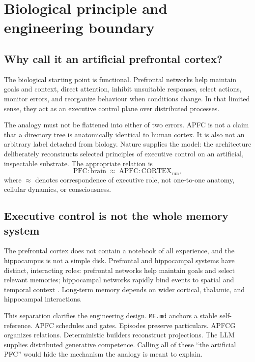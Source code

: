 \documentclass[10pt,twocolumn]{article}
\theoremstyle{definition}
\theoremstyle{plain}
\theoremstyle{remark}
\newcommand{\file}[1]{\nolinkurl{#1}}
\begin{document}
\section{Biological principle and engineering boundary}

\subsection{Why call it an artificial prefrontal cortex?}

The biological starting point is functional.  Prefrontal networks help maintain goals and context, direct attention, inhibit unsuitable responses, select actions, monitor errors, and reorganize behaviour when conditions change.  In that limited sense, they act as an executive control plane over distributed processes.

The analogy must not be flattened into either of two errors.  APFC is not a claim that a directory tree is anatomically identical to human cortex.  It is also not an arbitrary label detached from biology.  Nature supplies the model: the architecture deliberately reconstructs selected principles of executive control on an artificial, inspectable substrate.  The appropriate relation is
\begin{equation}
\mathrm{PFC} : \mathrm{brain} \;\approx\; \mathrm{APFC} : \mathrm{CORTEX}_{\mathrm{run}},
\label{eq:analogy}
\end{equation}
where $\approx$ denotes correspondence of executive role, not one-to-one anatomy, cellular dynamics, or consciousness.

\subsection{Executive control is not the whole memory system}

The prefrontal cortex does not contain a notebook of all experience, and the hippocampus is not a simple disk.  Prefrontal and hippocampal systems have distinct, interacting roles: prefrontal networks help maintain goals and select relevant memories; hippocampal networks rapidly bind events to spatial and temporal context \citep{eichenbaum2017pfc}.  Long-term memory depends on wider cortical, thalamic, and hippocampal interactions.

This separation clarifies the engineering design.  \file{ME.md} anchors a stable self-reference.  APFC schedules and gates.  Episodes preserve particulars.  APFCG organizes relations.  Deterministic builders reconstruct projections.  The LLM supplies distributed generative competence.  Calling all of these ``the artificial PFC'' would hide the mechanism the analogy is meant to explain.
\end{document}
